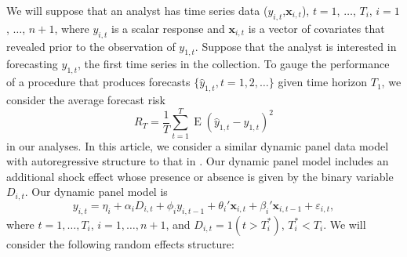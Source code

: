 \documentclass[11pt]{article}
\newcommand{\x}{\textbf{x}}
\newcommand{\indep}{\perp\!\!\!\perp}
\DeclareMathOperator{\E}{E}
\begin{document}
We will suppose that an analyst has time series data ($y_{i,t}$,$\x_{i,t}$), 
$t = 1$, $\ldots$, $T_i$, $i = 1$, $\ldots$, $n+1$, where $y_{i,t}$ is a 
scalar response and $\x_{i,t}$ is a vector of covariates that revealed prior 
to the observation of $y_{1,t}$.  Suppose that the analyst is interested in 
forecasting $y_{1,t}$, the first time series in the collection.
To gauge the performance of a procedure that produces forecasts 
$\{\hat y_{1,t}, t= 1,2,\ldots\}$ given time horizon $T_1$, we consider the 
average forecast risk
$$
  R_T = \frac{1}{T}\sum_{t=1}^T\E(\hat y_{1,t} - y_{1,t})^2
$$
in our analyses. In this article, we consider a similar dynamic panel data 
model with autoregressive structure to that in \citet{blundell1998initial}. 
Our dynamic panel model includes an additional shock effect whose presence 
or absence is given by the binary variable $D_{i,t}$.  Our dynamic panel 
model is 
\begin{equation} \label{DPM}
  y_{i,t} = \eta_i + \alpha_iD_{i,t} + \phi_i y_{i,t-1} + \theta_i' \x_{i,t} + 
    \beta_i' \x_{i,t-1} + \varepsilon_{i,t},  
\end{equation}
where $t = 1,\ldots,T_i$, $i = 1,\ldots, n+1$, and $D_{i,t} = 1(t > T_i^*)$, 
$T_i^* < T_i$.  We will consider the following random effects structure:  
\end{document}
